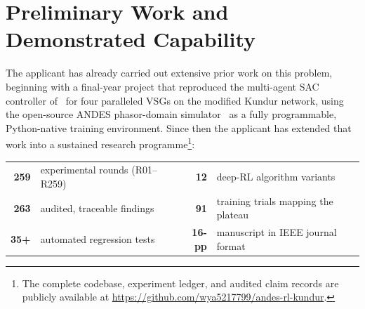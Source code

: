 \documentclass[11pt,a4paper]{article}
\begin{document}
\section{Preliminary Work and Demonstrated Capability}

The applicant has already carried out extensive prior work on this
problem, beginning with a
final-year project that reproduced the multi-agent SAC controller
of~\cite{yang2023ddic} for four paralleled VSGs on the modified Kundur
network, using the open-source ANDES phasor-domain
simulator~\cite{cui2021andes} as a fully programmable, Python-native
training environment. Since then the applicant has extended that work into a sustained research programme\footnote{The complete codebase, experiment ledger, and audited claim records are publicly available at \url{https://github.com/wya5217799/andes-rl-kundur}.}:

\begin{center}\small
\begin{tabular}{@{}r@{\quad}l@{\qquad}r@{\quad}l@{}}
\textbf{259} & experimental rounds (R01--R259) &
\textbf{12} & deep-RL algorithm variants \\
\textbf{263} & audited, traceable findings &
\textbf{91} & training trials mapping the plateau \\
\textbf{35+} & automated regression tests &
\textbf{16-pp} & manuscript in IEEE journal format \\
\end{tabular}
\end{center}
\end{document}
